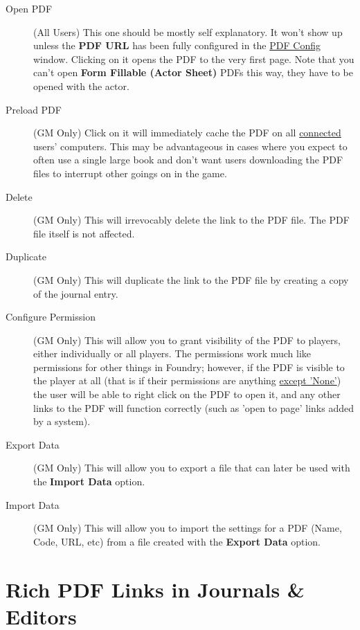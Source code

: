 \documentclass{article}
\begin{document}
    \begin{description}

        \item [Open PDF] (All Users) This one should be mostly self explanatory. It won't show up unless the \textbf{PDF URL} has been fully configured in the \hyperref[sec:creating-opening-pdfs]{PDF Config} window. Clicking on it opens the PDF to the very first page. Note that you can't open \textbf{Form Fillable (Actor Sheet)} PDFs this way, they have to be opened with the actor.

        \item [Preload PDF] (GM Only) Click on it will immediately cache the PDF on all \underline{connected} users' computers. This may be advantageous in cases where you expect to often use a single large book and don't want users downloading the PDF files to interrupt other goings on in the game.

        \item [Delete] (GM Only) This will irrevocably delete the link to the PDF file. The PDF file itself is not affected.

        \item [Duplicate] (GM Only) This will duplicate the link to the PDF file by creating a copy of the journal entry.

        \item [Configure Permission] (GM Only) This will allow you to grant visibility of the PDF to players, either individually or all players. The permissions work much like permissions for other things in Foundry; however, if the PDF is visible to the player at all (that is if their permissions are anything \underline{except 'None'}) the user will be able to right click on the PDF to open it, and any other links to the PDF will function correctly (such as 'open to page' links added by a system).

        \item [Export Data] (GM Only) This will allow you to export a file that can later be used with the \textbf{Import Data} option.

        \item [Import Data] (GM Only) This will allow you to import the settings for a PDF (Name, Code, URL, etc) from a file created with the \textbf{Export Data} option.

    \end{description}

    \section{Rich PDF Links in Journals \& Editors}
\end{document}
